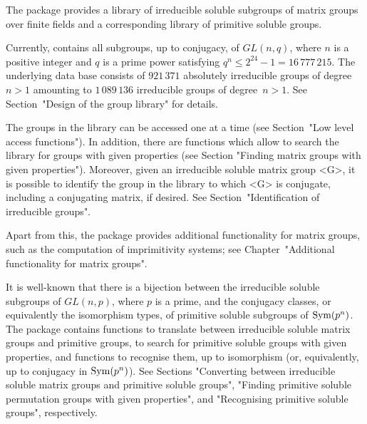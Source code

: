 

The package {\IRREDSOL} provides a library of irreducible
soluble subgroups of matrix groups over finite fields and a corresponding library of primitive soluble groups.

Currently, {\IRREDSOL} contains all subgroups, up to conjugacy, of $GL(n, q)$, 
where $n$ is a positive integer and $q$
is a prime power satisfying  $q^n \leq 2^{24} - 1 = 16\,777\,215$. The underlying data base consists of 
$ 921\,371$ absolutely irreducible groups of degree $n > 1$ amounting to $1\,089\,136$ irreducible groups of degree~$n>1$. See Section~"Design of the group library" for details.

The groups in the {\IRREDSOL} 
library can be accessed one at a time (see Section~"Low
level access functions"). In addition, there are functions which allow to 
search the library for groups with given properties (see Section "Finding
matrix groups with given properties"). Moreover, given an irreducible soluble matrix group
<G>, it is possible to identify the group in the library to which <G> is conjugate,
including a conjugating matrix, if desired. See Section~"Identification of irreducible
groups".

Apart from this, the {\IRREDSOL} package provides additional functionality
for matrix groups, such as the computation of imprimitivity systems;
see Chapter~"Additional functionality for matrix groups".

It is well-known that there is a bijection between the  irreducible soluble subgroups of
$GL(n, p)$, where
$p$ is a prime, and the conjugacy classes, or equivalently the isomorphism types, of
primitive soluble subgroups of ${\rm Sym}(p^n)$. The {\IRREDSOL} package contains
functions to translate between irreducible soluble matrix groups and primitive
groups, to search for primitive soluble groups with given  properties, and functions to
recognise them, up to isomorphism (or, equivalently, up to conjugacy in ${\rm Sym}(p^n)$).  See Sections "Converting between irreducible soluble
matrix groups and primitive soluble groups", "Finding primitive soluble permutation
groups with given properties", and "Recognising primitive soluble groups", respectively.

